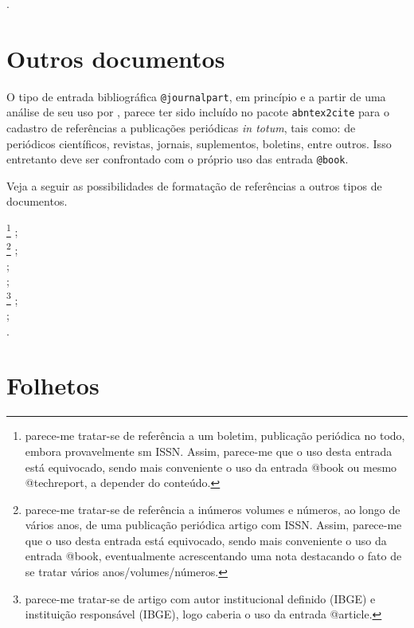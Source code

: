 \begin{apendicesenv}
{\small
    \cite{cruvinel1989}.\\
}



\section{Outros documentos}
\label{sec:Outrosdocs}


O tipo de entrada bibliográfica \verb|@journalpart|, em princípio e a partir de uma análise de seu uso por , parece ter sido incluído no pacote \texttt{abntex2cite} para o cadastro de referências a publicações periódicas \textit{in totum}, tais como: de periódicos científicos, revistas, jornais, suplementos, boletins, entre outros. Isso entretanto deve ser confrontado com o próprio uso das entrada \verb|@book|.

Veja a seguir as possibilidades de formatação de referências a outros tipos de documentos.

{\small
    \cite{boletim1965}\footnote{parece-me tratar-se de referência a um boletim, publicação periódica no todo, embora provavelmente sm ISSN. Assim, parece-me que o uso desta entrada está equivocado, sendo mais conveniente o uso da entrada {\ttfamily @book} ou mesmo {\ttfamily @techreport}, a depender do conteúdo.} ;\\
    \cite{febab1973}\footnote{parece-me tratar-se de referência a inúmeros volumes e números, ao longo de vários anos, de uma publicação periódica artigo com ISSN. Assim, parece-me que o uso desta entrada está equivocado, sendo mais conveniente o uso da entrada {\ttfamily @book}, eventualmente acrescentando uma nota destacando o fato de se tratar vários anos/volumes/números.} ;\\
    \cite{fgv1984} ;\\
    \cite{grafica1985} ;\\
    \cite{ibge1983} \footnote{parece-me tratar-se de artigo com autor institucional definido (IBGE) e instituição responsável (IBGE), logo caberia o uso da entrada {\ttfamily @article}.} ;\\
    \cite{industria1957} ;\\
    \cite{tres2000}.\\
}



\section{Folhetos}
\label{sec:booklets}



\end{apendicesenv}
